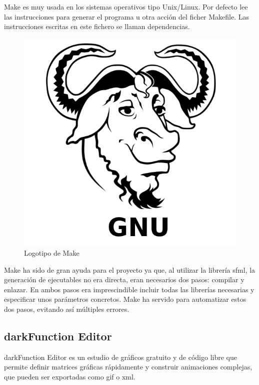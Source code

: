 		Make es muy usada en los sistemas operativos tipo Unix/Linux. Por defecto lee las instrucciones para generar el programa u otra acción del ficher Makefile. Las instrucciones escritas en este fichero se llaman dependencias.

		\begin{figure}[!htp]
			 \centering
			 \includegraphics[scale=.25]{fig/make}
			 \caption{Logotipo de Make}
			 \label{fig:make}
		\end{figure}

		\FloatBarrier

		Make ha sido de gran ayuda para el proyecto ya que, al utilizar la librería \acrshort{sfml}, la generación de ejecutables no era directa, eran necesarios dos pasos: compilar y enlazar. En ambos pasos era imprescindible incluir todas las librerías necesarias y especificar unos parámetros concretos. Make ha servido para automatizar estos dos pasos, evitando así múltiples errores.

	\subsection{darkFunction Editor}

		darkFunction Editor es un estudio de gráficos gratuito y de código libre que permite definir matrices gráficas rápidamente y construir animaciones complejas, que pueden ser exportadas como \acrshort{gif} o \acrshort{xml}.

